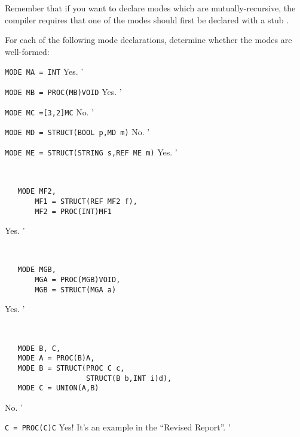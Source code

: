 Remember that if you want to declare modes which are
mutually-recursive, the  compiler
requires that one of the modes should first be declared with a stub
.

\begin{exercise}
\item For each of the following mode declarations, determine whether
the modes are well-formed:
\begin{subex}
\item \texttt{MODE MA = INT} \subans Yes.
'
\item \texttt{MODE MB = PROC(MB)VOID} \subans Yes.
'
\item \texttt{MODE MC =[3,2]MC} \subans No.
'
\item \texttt{MODE MD = STRUCT(BOOL p,MD m)} \subans No.
'
\item \texttt{MODE ME = STRUCT(STRING s,REF ME m)} \subans Yes.
'
\item \ %
\begin{verbatim}
   MODE MF2,
       MF1 = STRUCT(REF MF2 f),
       MF2 = PROC(INT)MF1
\end{verbatim}
\indent \subans Yes.
'
\item \ %
\begin{verbatim}
   MODE MGB,
       MGA = PROC(MGB)VOID,
       MGB = STRUCT(MGA a)
\end{verbatim}
\indent \subans Yes.
'
\item \ %
\begin{verbatim}
   MODE B, C,
   MODE A = PROC(B)A,
   MODE B = STRUCT(PROC C c,
                   STRUCT(B b,INT i)d),
   MODE C = UNION(A,B)
\end{verbatim}
\indent \subans No.
'
\item \verb|C = PROC(C)C| \subans Yes! It's an example in the
``Revised Report''.
'
\end{subex}
\end{exercise}


